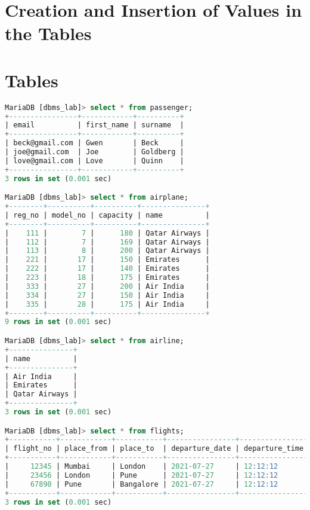 \documentclass[11pt]{article}
\begin{document}
\section{Creation and Insertion of Values in the Tables}



\section{Tables}

\begin{lstlisting}[language=sql]
MariaDB [dbms_lab]> select * from passenger;
+----------------+------------+----------+
| email          | first_name | surname  |
+----------------+------------+----------+
| beck@gmail.com | Gwen       | Beck     |
| joe@gmail.com  | Joe        | Goldberg |
| love@gmail.com | Love       | Quinn    |
+----------------+------------+----------+
3 rows in set (0.001 sec)

MariaDB [dbms_lab]> select * from airplane;
+--------+----------+----------+---------------+
| reg_no | model_no | capacity | name          |
+--------+----------+----------+---------------+
|    111 |        7 |      180 | Qatar Airways |
|    112 |        7 |      169 | Qatar Airways |
|    113 |        8 |      200 | Qatar Airways |
|    221 |       17 |      150 | Emirates      |
|    222 |       17 |      140 | Emirates      |
|    223 |       18 |      175 | Emirates      |
|    333 |       27 |      200 | Air India     |
|    334 |       27 |      150 | Air India     |
|    335 |       28 |      175 | Air India     |
+--------+----------+----------+---------------+
9 rows in set (0.001 sec)

MariaDB [dbms_lab]> select * from airline;
+---------------+
| name          |
+---------------+
| Air India     |
| Emirates      |
| Qatar Airways |
+---------------+
3 rows in set (0.001 sec)

MariaDB [dbms_lab]> select * from flights;
+-----------+------------+-----------+----------------+----------------+--------------+--------------+--------+
| flight_no | place_from | place_to  | departure_date | departure_time | arrival_date | arrival_time | reg_no |
+-----------+------------+-----------+----------------+----------------+--------------+--------------+--------+
|     12345 | Mumbai     | London    | 2021-07-27     | 12:12:12       | 2021-07-28   | 23:59:56     |    111 |
|     23456 | London     | Pune      | 2021-07-27     | 12:12:12       | 2021-07-28   | 22:59:56     |    333 |
|     67890 | Pune       | Bangalore | 2021-07-27     | 12:12:12       | 2021-07-27   | 16:59:56     |    221 |
+-----------+------------+-----------+----------------+----------------+--------------+--------------+--------+
3 rows in set (0.001 sec)


\end{lstlisting}
\end{document}
